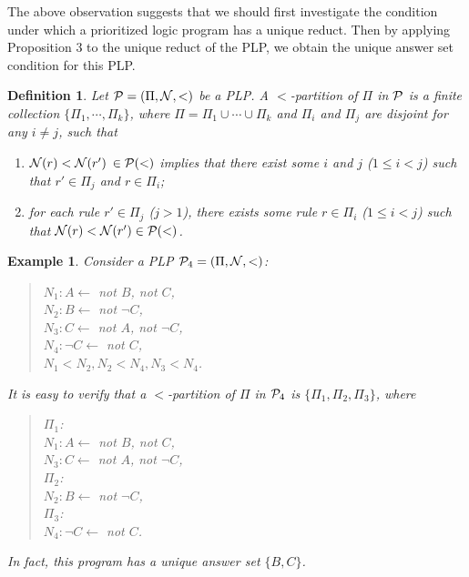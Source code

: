 \documentclass{tlp}
\newtheorem{definition}{Definition} %
\newtheorem{example}{Example} %
\begin{document}
The above observation suggests that we should first investigate
the condition under which a prioritized logic program has a unique
reduct. Then by applying Proposition 3 to the unique reduct of the PLP,
we obtain the unique answer set condition for this PLP.

\begin{definition}
Let ${\cal P}=(\Pi,{\cal N},<)$ be a PLP.
A $<$-{\em partition} of $\Pi$ in
${\cal P}$ is a finite collection $\{\Pi_{1},\cdots, \Pi_{k}\}$,
where $\Pi=\Pi_{1}\cup\cdots \cup\Pi_{k}$ and
$\Pi_{i}$ and $\Pi_{j}$ are disjoint for any $i\neq j$, such that
\begin{enumerate}
\item
${\cal N}(r)<{\cal N}(r')$ $\in {\cal P}(<)$ implies that
there exist some $i$ and $j$ ($1\leq i<j$) such that
$r'\in \Pi_{j}$ and $r\in \Pi_{i}$;
\item
for each rule $r' \in \Pi_{j}$ ($j>1$),
there exists some rule $r\in \Pi_{i}$ ($1\leq i < j$) such that
${\cal N}(r)<{\cal N}(r') \in {\cal P}(<)$.
\end{enumerate}
\end{definition}

\begin{example}
Consider a PLP ${\cal P}_{4}=(\Pi,{\cal N},<)$:
\begin{quote}
$N_{1}: A\leftarrow$ {\em not} $B$, {\em not} $C$,\\
\hspace*{.1in} $N_{2}: B\leftarrow$ {\em not} $\neg C$,\\
\hspace*{.1in} $N_{3}: C\leftarrow$ {\em not} $A$, {\em not} $\neg C$,\\
\hspace*{.1in} $N_{4}: \neg C\leftarrow$ {\em not} $C$, \\
\hspace*{.1in} $N_{1}<N_{2}, N_{2}<N_{4}, N_{3}<N_{4}$.
\end{quote}
It is easy to verify that a $<$-partition of $\Pi$ in
${\cal P}_{4}$ is $\{\Pi_{1}, \Pi_{2}, \Pi_{3}\}$, where
\begin{quote}
$\Pi_{1}$:  \\
\hspace*{.2in} $N_{1}: A\leftarrow$ {\em not} $B$, {\em not} $C$, \\
\hspace*{.2in} $N_{3}: C\leftarrow$ {\em not} $A$, {\em not} $\neg C$,\\
\hspace*{.1in} $\Pi_{2}$:\\
\hspace*{.2in} $N_{2}: B\leftarrow$ {\em not} $\neg C$,\\
\hspace*{.1in} $\Pi_{3}$:  \\
\hspace*{.2in} $N_{4}: \neg C\leftarrow$ {\em not} $C$.
\end{quote}
In fact, this program has a unique answer set $\{B, C\}$.
\end{example}
\end{document}
